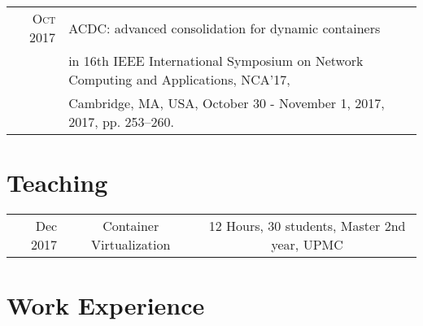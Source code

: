 \documentclass[a4paper,10pt]{article} %
\begin{document}
\begin{tabular}{rl}
\textsc{Oct 2017} & ACDC: advanced consolidation for dynamic containers\\
                  & \footnotesize{in 16th IEEE International Symposium on Network Computing and Applications, NCA'17,}\\
                  & \footnotesize{Cambridge, MA, USA, October 30 - November 1, 2017, 2017, pp. 253–260.} \\
\end{tabular}

\section{Teaching}

\begin{tabular}{rcc}
Dec 2017 & Container Virtualization & 12 Hours, 30 students, Master 2nd year, UPMC\\
\end{tabular}

\section{Work Experience}
\end{document}

